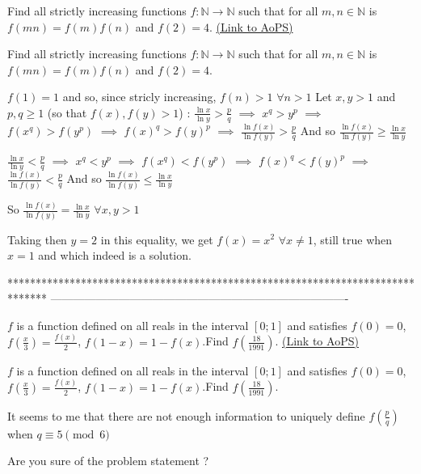 \begin{problem}
	Find all strictly increasing functions $f: \mathbb{N} \to \mathbb{N}$ such that for all $m,n \in \mathbb{N}$ is $f(mn)=f(m)f(n)$ and $f(2)=4$.
	\flushright \href{https://artofproblemsolving.com/community/c6h569869}{(Link to AoPS)}
\end{problem}



\begin{solution}
	\begin{tcolorbox}Find all strictly increasing functions $f: \mathbb{N} \to \mathbb{N}$ such that for all $m,n \in \mathbb{N}$ is $f(mn)=f(m)f(n)$ and $f(2)=4$.\end{tcolorbox}
$f(1)=1$ and so, since stricly increasing, $f(n)>1$ $\forall n>1$
Let $x,y>1$ and $p,q\ge 1$ (so that $f(x),f(y)>1$) :
$\frac{\ln x}{\ln y}>\frac pq$ $\implies$ $x^q>y^p$ $\implies$ $f(x^q)>f(y^p)$ $\implies$ $f(x)^q>f(y)^p$ $\implies$ $\frac{\ln f(x)}{\ln f(y)}>\frac pq$
And so $\frac{\ln f(x)}{\ln f(y)}\ge\frac{\ln x}{\ln y}$

$\frac{\ln x}{\ln y}<\frac pq$ $\implies$ $x^q<y^p$ $\implies$ $f(x^q)<f(y^p)$ $\implies$ $f(x)^q<f(y)^p$ $\implies$ $\frac{\ln f(x)}{\ln f(y)}<\frac pq$
And so $\frac{\ln f(x)}{\ln f(y)}\le\frac{\ln x}{\ln y}$

So $\frac{\ln f(x)}{\ln f(y)}=\frac{\ln x}{\ln y}$ $\forall x,y>1$

Taking then $y=2$ in this equality, we get $\boxed{f(x)=x^2}$ $\forall x\ne 1$, still true when $x=1$ and which indeed is a solution.
\end{solution}
*******************************************************************************
-------------------------------------------------------------------------------

\begin{problem}
	$f$ is a function defined on all reals in the interval $[0;1]$ and satisfies $f(0)=0$, $f(\frac{x}{3})=\frac{f(x)}{2}$, $f(1-x)=1-f(x)$.Find $f(\frac{18}{1991})$.
	\flushright \href{https://artofproblemsolving.com/community/c6h569915}{(Link to AoPS)}
\end{problem}



\begin{solution}
	\begin{tcolorbox}$f$ is a function defined on all reals in the interval $[0;1]$ and satisfies $f(0)=0$, $f(\frac{x}{3})=\frac{f(x)}{2}$, $f(1-x)=1-f(x)$.Find $f(\frac{18}{1991})$.\end{tcolorbox}
It seems to me that there are not enough information to uniquely define $f(\frac pq)$ when $q\equiv 5\pmod 6$

Are you sure of the problem statement ?
\end{solution}



